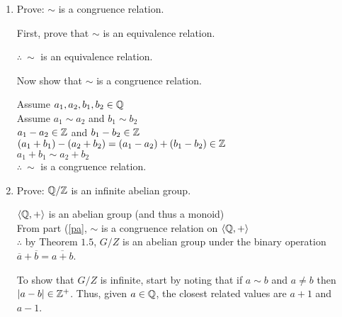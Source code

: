 \documentclass[letterpaper,12pt,fleqn]{article}
\newcommand{\ec}[1]{\overline{#1}}
\newcommand{\bas}[2]{\left<#1,#2\right>}
\begin{document}
\begin{enumerate}[label=\alph*)]
\item\label{pa} Prove: $\sim$ is a congruence relation.

  First, prove that $\sim$ is an equivalence relation.

  $\therefore\ \sim$ is an equivalence relation.

  Now show that $\sim$ is a congruence relation.

  Assume $a_1,a_2,b_1,b_2\in\mathbb{Q}$ \\
  Assume $a_1\sim a_2$ and $b_1\sim b_2$ \\
  $a_1-a_2\in\mathbb{Z}$ and $b_1-b_2\in\mathbb{Z}$ \\
  $(a_1+b_1)-(a_2+b_2)=(a_1-a_2)+(b_1-b_2)\in\mathbb{Z}$ \\
  $a_1+b_1\sim a_2+b_2$ \\
  $\therefore\ \sim$ is a congruence relation.

\item Prove: $\mathbb{Q}/\mathbb{Z}$ is an infinite abelian group.

  $\bas{\Q}{+}$ is an abelian group (and thus a monoid) \\
  From part (\ref{pa}, $\sim$ is a congruence relation on $\bas{\Q}{+}$ \\
  $\therefore$ by Theorem $1.5$, $G/Z$ is an abelian group under the binary
  operation $\ec{a}+\ec{b}=\ec{a+b}$.

  To show that $G/Z$ is infinite, start by noting that if $a\sim b$ and
  $a\ne b$ then $\lvert a-b\rvert\in\mathbb{Z}^+$. Thus, given $a\in\mathbb{Q}$, the closest related
  values are $a+1$ and $a-1$.


\end{enumerate}
\end{document}
